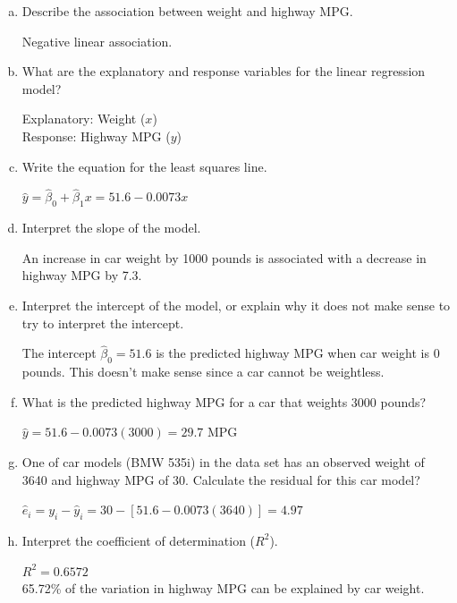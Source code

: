 \documentclass[12pt, fleqn]{article}\usepackage[]{graphicx}\usepackage[]{color}
\begin{document}
\begin{enumerate}[(a)]
\item Describe the association between weight and highway MPG.

Negative linear association.\\

\item What are the explanatory and response variables for the linear regression model?

Explanatory: Weight ($x$)\\
Response: Highway MPG ($y$)\\

\item Write the equation for the least squares line.

$\hat{y} = \hat{\beta}_0 + \hat{\beta}_1 x = 51.6 - 0.0073 x$\\

\item Interpret the slope of the model.

An increase in car weight by 1000 pounds is associated with a decrease in highway MPG by 7.3.\\ 

\item Interpret the intercept of the model, or explain why it does not make sense to try to interpret the intercept.

The intercept $\hat{\beta}_0 = 51.6$ is the predicted highway MPG when car weight is 0 pounds.  This doesn't make sense since a car cannot be weightless.\\  

\item What is the predicted highway MPG for a car that weights 3000 pounds?

$\hat{y} = 51.6 - 0.0073 (3000) = 29.7$ MPG\\

\item One of car models (BMW 535i) in the data set has an observed weight of 3640 and highway MPG of 30.  Calculate the residual for this car model?

$\hat{e}_i = y_i - \hat{y}_i = 30 - [51.6 - 0.0073 (3640)] = 4.97$\\

\item Interpret the coefficient of determination ($R^2$).

$R^2 = 0.6572$\\
65.72\% of the variation in highway MPG can be explained by car weight.\\
\end{enumerate}
\end{document}
